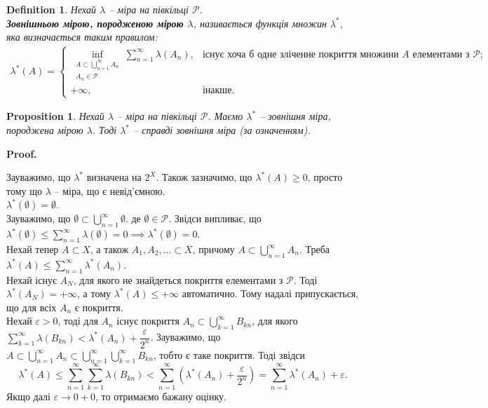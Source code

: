 \documentclass[a4paper, 10pt]{article}
\makeatletter
\theoremstyle{theoremdd}
\newtheorem{definition}[theorem]{Definition}
\newtheorem{proposition}[theorem]{Proposition}
\renewenvironment{proof}[1][Proof.\\]{\par
\pushQED{\hfill \qed}%
\normalfont \topsep6\p@\@plus6\p@\relax
\trivlist
\item\relax
{\bfseries
#1\@addpunct{.}}\hspace\labelsep\ignorespaces
}{%
\popQED\endtrivlist\@endpefalse
}
\makeatother
\begin{document}
\begin{definition}
Нехай $\lambda$ -- міра на півкільці $\mathcal{P}$.\\
\textbf{Зовнішньою мірою, породженою мірою $\lambda$}, називається функція множин $\lambda^*$, яка визначається таким правилом:
\begin{align*}
\lambda^*(A) = \begin{cases} \displaystyle\inf_{\substack{A \subset \bigcup_{n=1}^\infty A_n \\ A_n \in \mathcal{P}}} \sum_{n=1}^\infty \lambda(A_n), & \text{існує хоча б одне зліченне покриття множини $A$ елементами з $\mathcal{P}$;} \\
+\infty, & \text{інакше}. \end{cases}
\end{align*}
\end{definition}

\begin{proposition}
Нехай $\lambda$ -- міра на півкільці $\mathcal{P}$. Маємо $\lambda^*$ -- зовнішня міра, породжена мірою $\lambda$. Тоді $\lambda^*$ -- справді зовнішня міра (за означенням).
\end{proposition}

\begin{proof}
Зауважимо, що $\lambda^*$ визначена на $2^X$. Також зазначимо, що $\lambda^*(A) \geq 0$, просто тому що $\lambda$ -- міра, що є невід'ємною.
\bigskip \\
$\lambda^*(\emptyset) = \emptyset$.\\
Зауважимо, що $\emptyset \subset \displaystyle\bigcup_{n=1}^\infty \emptyset$. де $\emptyset \in \mathcal{P}$. Звідси випливає, що $\lambda^*(\emptyset) \leq \displaystyle\sum_{n=1}^\infty \lambda(\emptyset) = 0 \implies \lambda^*(\emptyset) = 0$.
\bigskip \\
Нехай тепер $A \subset X$, а також $A_1,A_2,\dots \subset X$, причому $A \subset \displaystyle\bigcup_{n=1}^\infty A_n$. Треба $\lambda^*(A) \leq \displaystyle\sum_{n=1}^\infty \lambda^*(A_n)$.\\
Нехай існує $A_N$, для якого не знайдеться покриття елементами з $\mathcal{P}$. Тоді $\lambda^*(A_N) = +\infty$, а тому $\lambda^*(A) \leq +\infty$ автоматично. Тому надалі припускається, що для всіх $A_n$ є покриття.\\
Нехай $\varepsilon > 0$, тоді для $A_n$ існує покриття $A_n \subset \displaystyle\bigcup_{k=1}^\infty B_{kn}$, для якого $\displaystyle\sum_{k=1}^\infty \lambda(B_{kn}) < \lambda^*(A_n) + \dfrac{\varepsilon}{2^n}$. Зауважимо, що $A \subset \displaystyle\bigcup_{n=1}^\infty A_n \subset \bigcup_{n=1}^\infty \bigcup_{k=1}^\infty B_{kn}$, тобто є таке покриття. Тоді звідси
\[
\lambda^*(A) \leq \displaystyle\sum_{n=1}^\infty \sum_{k=1}^\infty \lambda(B_{kn}) < \sum_{n=1}^\infty \left( \lambda^*(A_n) + \dfrac{\varepsilon}{2^n} \right) = \sum_{n=1}^\infty \lambda^*(A_n) + \varepsilon.
\]
Якщо далі $\varepsilon \to 0+0$, то отримаємо бажану оцінку.
\end{proof}
\end{document}
